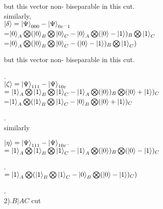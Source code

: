 \documentclass[a4paper,12pt]{article}
\begin{document}
 but this vector non- biseparable in this cut.
 \newline \\
 similarly,
 \newline \\
 $ \ket{\delta} =\ket{\Psi}_{000}- \ket{\Psi}_{0\varepsilon^{-}1} $
 \newline \\
  =$\ket{0}_{A}\bigotimes(\ket{0}_{B}\bigotimes\ket{0}_{C}-\ket{0}_{A}\bigotimes (\ket{0}-\ket{1})_{B}\bigotimes\ket{1}_{C}$
 \newline \\  
 \newline 
=$\ket{0}_{A}\bigotimes(\ket{0}_{B}\bigotimes\ket{0}_{C}-(\ket{0}-\ket{1})_{B}\bigotimes\ket{1}_{C}) $
\newline

 but this vector non- biseparable in this cut.
 
 
. \newline  \\
$ \ket{\zeta}=\ket{\Psi}_{111}-\ket{\Psi}_{10\varepsilon}$
\newline \\
       $ =\ket{1}_{A}\bigotimes \ket{1}_{B}\bigotimes\ket{1}_{C} -\ket{1}_{A}\bigotimes (\ket{0})_{B}\bigotimes(\ket{0}+\ket{1})_{C} $
 \newline \\
 =$\ket{1}_{A}\bigotimes(\ket{1}_{B}\bigotimes\ket{1}_{C}-\ket{0}_{B}\bigotimes(\ket{0}+\ket{1})_{C}$
 
.\newline \\
similarly

$ \ket{\eta}= \ket{\Psi}_{111}-\ket{\Psi}_{10\varepsilon^{-}}$
\newline \\
$ = \ket{1}_{A}\bigotimes \ket{1}_{B}\bigotimes\ket{1}_{C} -\ket{1}_{A}\bigotimes (\ket{0})_{B}\bigotimes(\ket{0}-\ket{1})_{C}$


  .\newline \\
  $ = \ket{1}_{A}\bigotimes(\ket{1}_{B}\bigotimes\ket{1}_{C}-\ket{0}_{B}\bigotimes(\ket{0}-\ket{1})_{C})$
 	
 	
 	.\newline \\
 	
 	
 
 	2).$B|AC$ cut
 	
\end{document}

